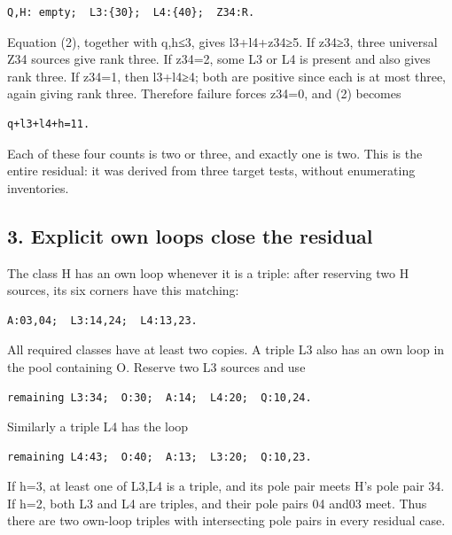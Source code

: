 \documentclass[
  10pt,
]{article}
\begin{document}
\begin{verbatim}
Q,H: empty;  L3:{30};  L4:{40};  Z34:R.
\end{verbatim}

Equation (2), together with q,h≤3, gives l3+l4+z34≥5. If z34≥3, three
universal Z34 sources give rank three. If z34=2, some L3 or L4 is
present and also gives rank three. If z34=1, then l3+l4≥4; both are
positive since each is at most three, again giving rank three. Therefore
failure forces z34=0, and (2) becomes

\begin{verbatim}
q+l3+l4+h=11.
\end{verbatim}

Each of these four counts is two or three, and exactly one is two. This
is the entire residual: it was derived from three target tests, without
enumerating inventories.

\hypertarget{explicit-own-loops-close-the-residual}{%
\subsection*{3. Explicit own loops close the
residual}\label{explicit-own-loops-close-the-residual}}

The class H has an own loop whenever it is a triple: after reserving two
H sources, its six corners have this matching:

\begin{verbatim}
A:03,04;  L3:14,24;  L4:13,23.
\end{verbatim}

All required classes have at least two copies. A triple L3 also has an
own loop in the pool containing O. Reserve two L3 sources and use

\begin{verbatim}
remaining L3:34;  O:30;  A:14;  L4:20;  Q:10,24.
\end{verbatim}

Similarly a triple L4 has the loop

\begin{verbatim}
remaining L4:43;  O:40;  A:13;  L3:20;  Q:10,23.
\end{verbatim}

If h=3, at least one of L3,L4 is a triple, and its pole pair meets H's
pole pair 34. If h=2, both L3 and L4 are triples, and their pole pairs
04 and03 meet. Thus there are two own-loop triples with intersecting
pole pairs in every residual case.
\end{document}

